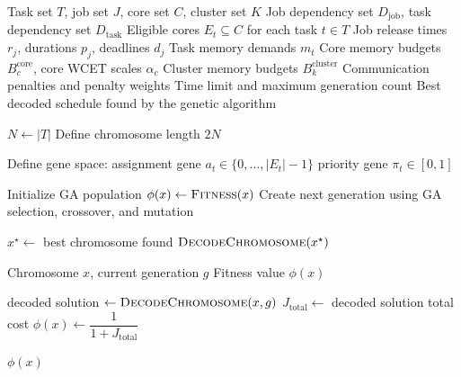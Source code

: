 \documentclass{article}
\begin{document}
\begin{algorithm}[H]
    \caption{Genetic Algorithm Scheduler}
    \label{alg:ga_scheduler}
    \begin{algorithmic}[1]
        \Require Task set $T$, job set $J$, core set $C$, cluster set $K$
        \Require Job dependency set $D_{\mathrm{job}}$, task dependency set $D_{\mathrm{task}}$
        \Require Eligible cores $E_t \subseteq C$ for each task $t \in T$
        \Require Job release times $r_j$, durations $p_j$, deadlines $d_j$
        \Require Task memory demands $m_t$
        \Require Core memory budgets $B^{\mathrm{core}}_c$, core WCET scales $\alpha_c$
        \Require Cluster memory budgets $B^{\mathrm{cluster}}_k$
        \Require Communication penalties and penalty weights
        \Require Time limit and maximum generation count
        \Ensure Best decoded schedule found by the genetic algorithm

        \State $N \gets |T|$
        \State Define chromosome length $2N$

        \Statex
        \State Define gene space:
            \State assignment gene $a_t \in \{0,\ldots,|E_t|-1\}$
        \EndFor
            \State priority gene $\pi_t \in [0,1]$
        \EndFor

        \Statex
        \State Initialize GA population
                \State $\phi(x) \gets \Call{Fitness}{x}$
            \EndFor
            \State Create next generation using GA selection, crossover, and mutation
        \EndWhile

        \State $x^\star \gets$ best chromosome found
        \State \Return $\Call{DecodeChromosome}{x^\star}$
    \end{algorithmic}
\end{algorithm}

\begin{algorithm}[H]
    \caption{Fitness Evaluation}
    \label{alg:fitness}
    \begin{algorithmic}[1]
        \Require Chromosome $x$, current generation $g$
        \Ensure Fitness value $\phi(x)$

        \State decoded solution $\gets \Call{DecodeChromosome}{x,g}$
        \State $J_{\mathrm{total}} \gets$ decoded solution total cost
        \State $\phi(x) \gets \dfrac{1}{1 + J_{\mathrm{total}}}$

        \State \Return $\phi(x)$
    \end{algorithmic}
\end{algorithm}
\end{document}
